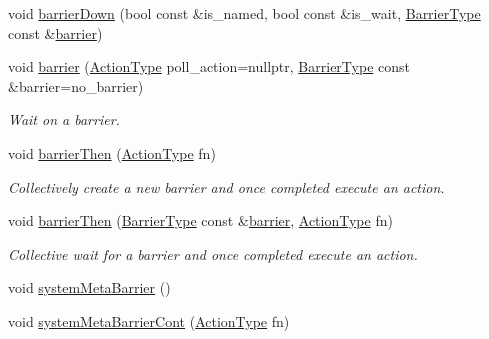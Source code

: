 \begin{DoxyCompactItemize}
\item 
void \hyperlink{structvt_1_1collective_1_1barrier_1_1_barrier_a962a1cbd78c359e1dee7a8e7df5cfd75}{barrier\+Down} (bool const \&is\+\_\+named, bool const \&is\+\_\+wait, \hyperlink{namespacevt_a25e481f0d6bbc7204db23d1c87a62e77}{Barrier\+Type} const \&\hyperlink{structvt_1_1collective_1_1barrier_1_1_barrier_a05124050c7d353a4f3475ee1875dd46a}{barrier})
\item 
void \hyperlink{structvt_1_1collective_1_1barrier_1_1_barrier_a05124050c7d353a4f3475ee1875dd46a}{barrier} (\hyperlink{namespacevt_ae0a5a7b18cc99d7b732cb4d44f46b0f3}{Action\+Type} poll\+\_\+action=nullptr, \hyperlink{namespacevt_a25e481f0d6bbc7204db23d1c87a62e77}{Barrier\+Type} const \&barrier=no\+\_\+barrier)
\begin{DoxyCompactList}\small\item\em Wait on a barrier. \end{DoxyCompactList}\item 
void \hyperlink{structvt_1_1collective_1_1barrier_1_1_barrier_a21adace64047e0e773fb4b55846aab2e}{barrier\+Then} (\hyperlink{namespacevt_ae0a5a7b18cc99d7b732cb4d44f46b0f3}{Action\+Type} fn)
\begin{DoxyCompactList}\small\item\em Collectively create a new barrier and once completed execute an action. \end{DoxyCompactList}\item 
void \hyperlink{structvt_1_1collective_1_1barrier_1_1_barrier_a3f1be86145f4b0fe20d6ffd67a285e53}{barrier\+Then} (\hyperlink{namespacevt_a25e481f0d6bbc7204db23d1c87a62e77}{Barrier\+Type} const \&\hyperlink{structvt_1_1collective_1_1barrier_1_1_barrier_a05124050c7d353a4f3475ee1875dd46a}{barrier}, \hyperlink{namespacevt_ae0a5a7b18cc99d7b732cb4d44f46b0f3}{Action\+Type} fn)
\begin{DoxyCompactList}\small\item\em Collective wait for a barrier and once completed execute an action. \end{DoxyCompactList}\item 
void \hyperlink{structvt_1_1collective_1_1barrier_1_1_barrier_a31b7fc393348cd50a9beac2372aabd79}{system\+Meta\+Barrier} ()
\item 
void \hyperlink{structvt_1_1collective_1_1barrier_1_1_barrier_ad3c1ad5f531262cfebcfd4295db341d4}{system\+Meta\+Barrier\+Cont} (\hyperlink{namespacevt_ae0a5a7b18cc99d7b732cb4d44f46b0f3}{Action\+Type} fn)
\end{DoxyCompactItemize}
